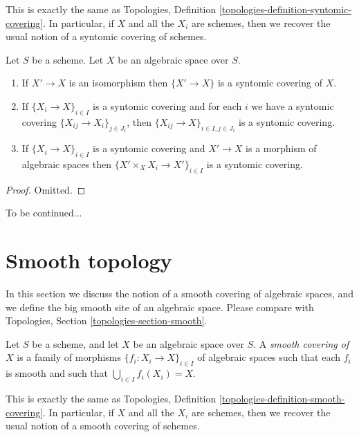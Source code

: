 \noindent
This is exactly the same as
Topologies, Definition \ref{topologies-definition-syntomic-covering}.
In particular, if $X$ and all the $X_i$ are schemes, then we recover the
usual notion of a syntomic covering of schemes.

\begin{lemma}
\label{lemma-syntomic}
Let $S$ be a scheme.
Let $X$ be an algebraic space over $S$.
\begin{enumerate}
\item If $X' \to X$ is an isomorphism then $\{X' \to X\}$
is a syntomic covering of $X$.
\item If $\{X_i \to X\}_{i\in I}$ is a syntomic covering and for each
$i$ we have a syntomic covering $\{X_{ij} \to X_i\}_{j\in J_i}$, then
$\{X_{ij} \to X\}_{i \in I, j\in J_i}$ is a syntomic covering.
\item If $\{X_i \to X\}_{i\in I}$ is a syntomic covering
and $X' \to X$ is a morphism of algebraic spaces then
$\{X' \times_X X_i \to X'\}_{i\in I}$ is a syntomic covering.
\end{enumerate}
\end{lemma}

\begin{proof}
Omitted.
\end{proof}

\noindent
To be continued...



\section{Smooth topology}
\label{section-smooth}

\noindent
In this section we discuss the notion of a smooth covering of
algebraic spaces, and we define the big smooth site of an
algebraic space. Please compare with
Topologies, Section \ref{topologies-section-smooth}.

\begin{definition}
\label{definition-smooth-covering}
Let $S$ be a scheme, and let $X$ be an algebraic space over $S$.
A {\it smooth covering of $X$} is a family of morphisms
$\{f_i : X_i \to X\}_{i \in I}$ of algebraic spaces
such that each $f_i$ is smooth
and such that $\bigcup_{i \in I} f_i(X_i) = X$.
\end{definition}

\noindent
This is exactly the same as
Topologies, Definition \ref{topologies-definition-smooth-covering}.
In particular, if $X$ and all the $X_i$ are schemes, then we recover the
usual notion of a smooth covering of schemes.

